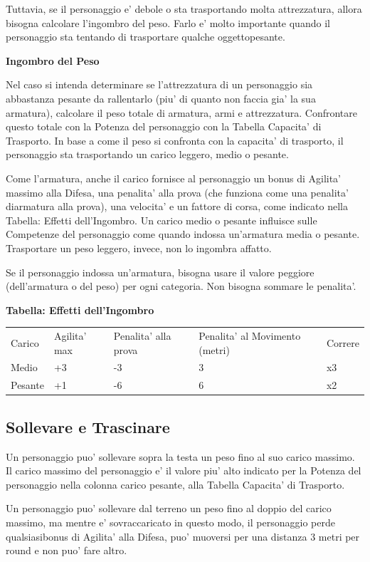 \documentclass[a4paper,11pt,twoside,openany]{dndbook}
\begin{document}
{Tuttavia, se il personaggio e' debole o sta trasportando molta attrezzatura, allora bisogna calcolare l'ingombro del peso. Farlo e' molto importante quando il personaggio sta tentando di trasportare qualche oggettopesante. 

\textbf{Ingombro del Peso}

Nel caso si intenda determinare se l'attrezzatura di un personaggio sia abbastanza pesante da rallentarlo (piu' di quanto non faccia gia' la sua armatura), calcolare il peso totale di armatura, armi e attrezzatura. Confrontare questo totale con la Potenza del personaggio con la Tabella Capacita' di Trasporto. In base a come il peso si confronta con la capacita' di trasporto, il personaggio sta trasportando un carico leggero, medio o pesante.

Come l'armatura, anche il carico fornisce al personaggio un bonus di Agilita' massimo alla Difesa, una penalita' alla prova (che funziona come una penalita' diarmatura alla prova), una velocita' e un fattore di corsa, come indicato nella Tabella: Effetti dell'Ingombro. Un carico medio o pesante influisce sulle Competenze del personaggio come quando indossa un'armatura media o pesante. Trasportare un peso leggero, invece, non lo ingombra affatto.

Se il personaggio indossa un'armatura, bisogna usare il valore peggiore (dell'armatura o del peso) per ogni categoria. Non bisogna sommare le penalita'.

\bigskip

\textbf{Tabella: Effetti dell'Ingombro}

\begin{tabular}[c]{@{}lllll@{}}
\toprule 
Carico & Agilita' max & Penalita' alla prova & Penalita' al Movimento (metri) & Correre\tabularnewline
Medio & +3 & -3 & 3 & x3\tabularnewline
Pesante & +1 & -6 & 6 & x2\tabularnewline
\bottomrule
\end{tabular}

\subsection{Sollevare e Trascinare}

Un personaggio puo' sollevare sopra la testa un peso fino al suo carico massimo. Il carico massimo del personaggio e' il valore piu' alto indicato per la Potenza del personaggio nella colonna carico pesante, alla Tabella Capacita' di Trasporto.

Un personaggio puo' sollevare dal terreno un peso fino al doppio del carico massimo, ma mentre e' sovraccaricato in questo modo, il personaggio perde qualsiasibonus di Agilita' alla Difesa, puo' muoversi per una distanza 3 metri per round e non puo' fare altro.

}
\end{document}
